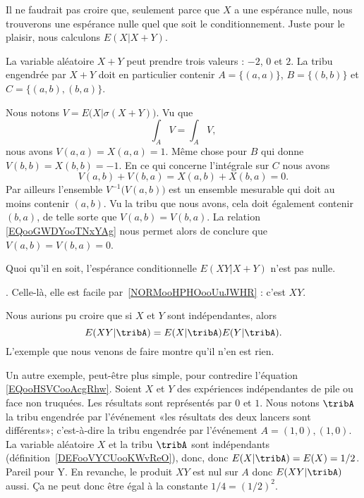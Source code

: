 \begin{subproof}
	\spitem[Calcul de \( E(X|X+Y)\)] Il ne faudrait pas croire que, seulement parce que \( X\) a une espérance nulle, nous trouverons une espérance nulle quel que soit le conditionnement. Juste pour le plaisir, nous calculons \( E(X|X+Y)\).

	La variable aléatoire \( X+Y\) peut prendre trois valeurs : \( -2\), \( 0\) et \( 2\). La tribu engendrée par \( X+Y\) doit en particulier contenir \( A=\{ (a,a) \}\), \( B=\{ (b,b) \}\) et \( C=\{ (a,b),(b,a) \}\).

	Nous notons \( V=E\big( X|\sigma(X+Y) \big)\). Vu que
	\begin{equation}
		\int_AV=\int_AV,
	\end{equation}
	nous avons \( V(a,a)=X(a,a)=1\). Même chose pour \( B\) qui donne \( V(b,b)=X(b,b)=-1\). En ce qui concerne l'intégrale sur \( C\) nous avons
	\begin{equation}        \label{EQooGWDYooTNxYAg}
		V(a,b)+V(b,a)=X(a,b)+X(b,a)=0.
	\end{equation}
	Par ailleurs l'ensemble \( V^{-1}\big( V(a,b) \big)\) est un ensemble mesurable qui doit au moins contenir \( (a,b)\). Vu la tribu que nous avons, cela doit également contenir \( (b,a)\), de telle sorte que \( V(a,b)=V(b,a)\). La relation \eqref{EQooGWDYooTNxYAg} nous permet alors de conclure que \( V(a,b)=V(b,a)=0\).

	Quoi qu'il en soit, l'espérance conditionnelle \( E(XY|X+Y)\) n'est pas nulle.

	. Celle-là, elle est facile par~\ref{NORMooHPHOooUuJWHR} : c'est \( XY\).

\end{subproof}

Nous aurions pu croire que si \( X\) et \( Y\) sont indépendantes, alors
\begin{equation}        \label{EQooHSVCooAcgRhw}
	E(XY|\tribA)=E(X|\tribA)E(Y|\tribA).
\end{equation}
L'exemple que nous venons de faire montre qu'il n'en est rien.

\begin{example}
	Un autre exemple, peut-être plus simple, pour contredire l'équation \eqref{EQooHSVCooAcgRhw}. Soient \( X\) et \( Y\) des expériences indépendantes de pile ou face non truquées. Les résultats sont représentés par \( 0\) et \( 1\). Nous notons \( \tribA\)  la tribu engendrée par l'événement «les résultats des deux lancers sont différents»; c'est-à-dire la tribu engendrée par l'événement \( A={(1,0),(1,0)}\). La variable aléatoire \( X\) et la tribu \( \tribA\) sont indépendants (définition~\ref{DEFooVYCUooKWvReO}), donc, donc \( E(X|\tribA)=E(X)=1/2\). Pareil pour Y. En revanche, le produit \( XY\) est nul sur \( A\) donc \( E(XY|\tribA)\) aussi. Ça ne peut donc être égal à la constante \( 1/4=(1/2)^2\).
\end{example}


